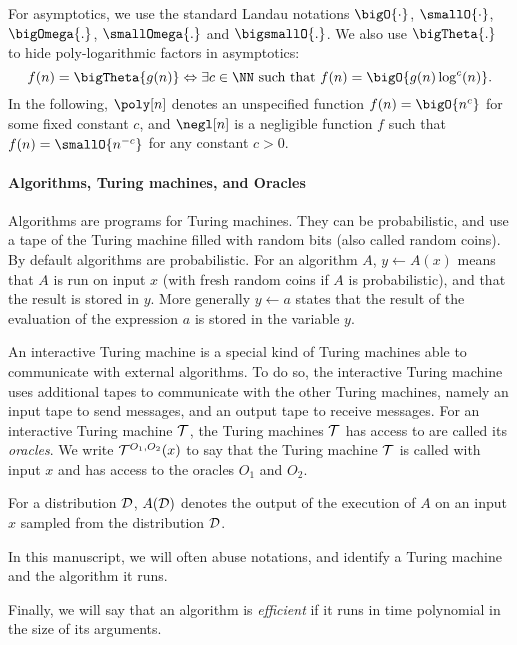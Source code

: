 For asymptotics, we use the standard Landau notations $\bigO{\cdot}$, $\smallO{\cdot}$, $\bigOmega{.}$, $\smallOmega{.}$ and $\bigsmallO{.}$.
We also use $\bigTheta{.}$ to hide poly-logarithmic factors in asymptotics:
\[
	f(n) = \bigTheta{g(n)} \Leftrightarrow \exists c \in \NN \text{ such that } f(n) = \bigO{g(n) \log^c(n)}.
\]
In the following, $\poly[n]$ denotes an unspecified function $f(n) = \bigO{n^c}$ for some fixed constant $c$, and $\negl[n]$ is a negligible function $f$ such that $f(n) = \smallO{n^{-c}}$ for any constant $c > 0$. 



\paragraph{Algorithms, Turing machines, and Oracles} %
\label{par:def_tm_oracles}

Algorithms are programs for Turing machines.
They can be probabilistic, and use a tape of the Turing machine filled with random bits (also called random coins).
By default algorithms are probabilistic. 
For an algorithm $A$, $y \gets A(x)$ means that $A$ is run on input $x$ (with fresh random coins if $A$ is probabilistic), and that the result is stored in $y$.
More generally $y \gets a$ states that the result of the evaluation of the expression $a$ is stored in the variable $y$.

An interactive Turing machine is a special kind of Turing machines able to communicate with external algorithms. 
To do so, the interactive Turing machine uses additional tapes to communicate with the other Turing machines, namely an input tape to send messages, and an output tape to receive messages.
For an interactive Turing machine $\mathcal{T}$, the Turing machines $\mathcal{T}$ has access to are called its \emph{oracles}.
We write $\mathcal{T}^{O_1, O_2}(x)$ to say that the Turing machine $\mathcal{T}$ is called with input $x$ and has access to the oracles $O_1$ and $O_2$.


For a distribution $\mathcal{D}$, $A(\mathcal{D})$ denotes the output of the execution of $A$ on an input $x$ sampled from the distribution $\mathcal{D}$.


In this manuscript, we will often abuse notations, and identify a Turing machine and the algorithm it runs. 

Finally, we will say that an algorithm is \emph{efficient} if it runs in time polynomial in the size of its arguments.


